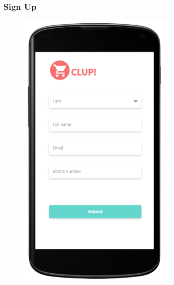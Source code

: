 \subsubsection{Sign Up}
\begin{figure}[H]
  \centering
  \includegraphics[width=0.7\textwidth,keepaspectratio]{images/7.png}
\end{figure}

